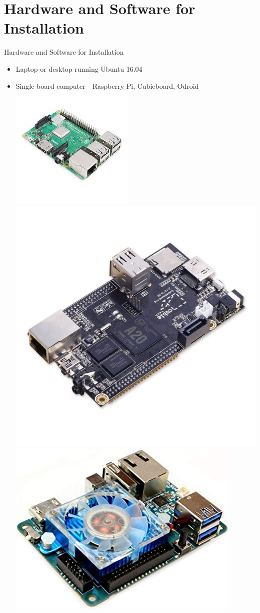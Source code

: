 \documentclass{beamer}
\begin{document}
\section{Hardware and Software for Installation}
\begin{frame}{Hardware and Software for Installation}{}
	\begin{itemize}
		\item Laptop or desktop running Ubuntu 16.04
		\item Single-board computer - Raspberry Pi, Cubieboard, Odroid
		\includegraphics[scale=0.5]{figs/rpi.jpg}
		\includegraphics[scale=0.15]{figs/cubieboard.jpg}
		\includegraphics[scale=0.2]{figs/odroid.jpg}

\end{itemize}
\end{frame}
\end{document}
